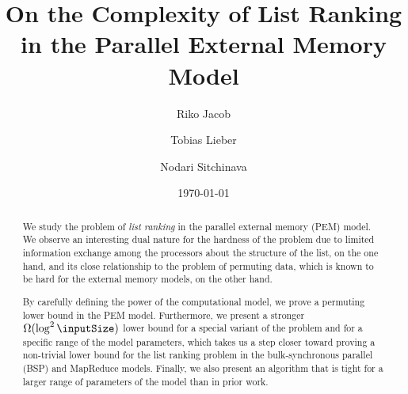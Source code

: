 \documentclass[envcountsame]{llncs}
\begin{document}
 

\pagestyle{plain}
\title{On the Complexity of List Ranking in the Parallel External Memory Model}

\author{
  Riko Jacob \and
  Tobias Lieber  \and
  Nodari Sitchinava 
}
\date{\today}

\maketitle


\begin{abstract}
We study the problem of {\em list ranking} in the parallel external memory (PEM) model. 
We observe an interesting dual nature for the hardness of the problem due to limited information exchange among the processors about the structure of the list, on the one hand, and its close relationship to the problem of permuting data, which is known to be hard for the external memory models, on the other hand. 

By carefully defining the power of the computational model, we prove a permuting lower bound in the PEM model.
Furthermore, we present a stronger $\Omega(\log^2 \inputSize)$ lower bound for a special variant of the problem and for a specific range of the model parameters, which takes us a step closer toward proving a non-trivial lower bound for the list ranking problem in the bulk-synchronous parallel (BSP) and MapReduce models.
Finally, we also present an algorithm that is tight for a larger range of parameters of the model than in prior work.





\end{abstract}


\end{document}
